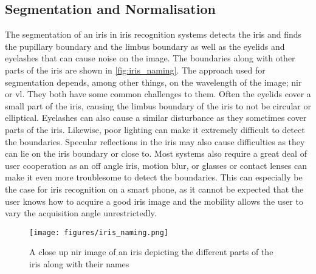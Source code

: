 \subsection{Segmentation and Normalisation}
The segmentation of an iris in iris recognition systems detects the iris and finds the pupillary boundary and the limbus boundary as well as the eyelids and eyelashes that can cause noise on the image. The boundaries along with other parts of the iris are shown in \autoref{fig:iris_naming}. The approach used for segmentation depends, among other things, on the wavelength of the image; \gls{nir} or \gls{vl}. They both have some common challenges to them. Often the eyelids cover a small part of the iris, causing the limbus boundary of the iris to not be circular or elliptical. Eyelashes can also cause a similar disturbance as they sometimes cover parts of the iris. Likewise, poor lighting can make it extremely difficult to detect the boundaries. Specular reflections in the iris may also cause difficulties as they can lie on the iris boundary or close to. Most systems also require a great deal of user cooperation as an off angle iris, motion blur, or glasses or contact lenses can make it even more troublesome to detect the boundaries. This can especially be the case for iris recognition on a smart phone, as it cannot be expected that the user knows how to acquire a good iris image and the mobility allows the user to vary the acquisition angle unrestrictedly. 

\begin{figure}[H]
\centering
\texttt{[image: figures/iris\_naming.png]} 
\caption{A close up \gls{nir} image of an iris depicting the different parts of the iris along with their names \citep{Bowyer2016b}}
\label{fig:iris_naming}
\end{figure}

